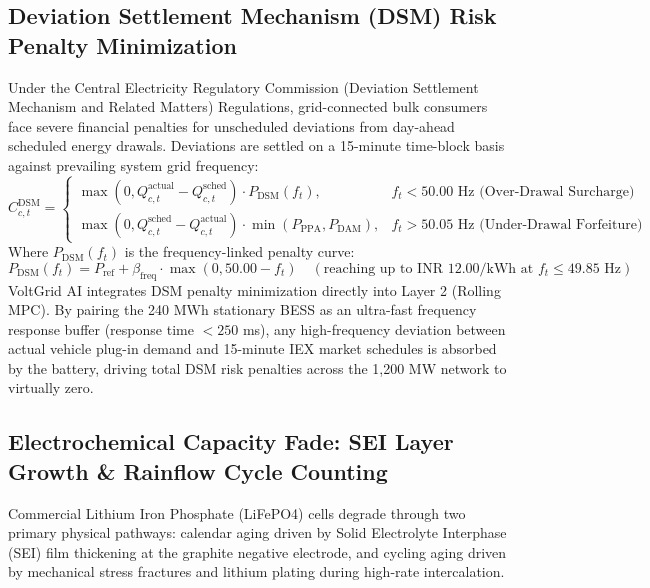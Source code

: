 \documentclass[10.5pt,a4paper]{article}
\begin{document}

\subsection{Deviation Settlement Mechanism (DSM) Risk Penalty Minimization}
Under the Central Electricity Regulatory Commission (Deviation Settlement Mechanism and Related Matters) Regulations, grid-connected bulk consumers face severe financial penalties for unscheduled deviations from day-ahead scheduled energy drawals. Deviations are settled on a 15-minute time-block basis against prevailing system grid frequency:
\begin{equation}
    C_{c,t}^{\text{DSM}} = \begin{cases}
        \max\left( 0, Q_{c,t}^{\text{actual}} - Q_{c,t}^{\text{sched}} \right) \cdot P_{\text{DSM}}(f_t), & f_t < 50.00\text{ Hz (Over-Drawal Surcharge)} \\
        \max\left( 0, Q_{c,t}^{\text{sched}} - Q_{c,t}^{\text{actual}} \right) \cdot \min\left( P_{\text{PPA}}, P_{\text{DAM}} \right), & f_t > 50.05\text{ Hz (Under-Drawal Forfeiture)}
    \end{cases}
\end{equation}
Where $P_{\text{DSM}}(f_t)$ is the frequency-linked penalty curve:
\begin{equation}
    P_{\text{DSM}}(f_t) = P_{\text{ref}} + \beta_{\text{freq}} \cdot \max(0, 50.00 - f_t) \quad (\text{reaching up to INR } 12.00/\text{kWh at } f_t \le 49.85\text{ Hz})
\end{equation}
VoltGrid AI integrates DSM penalty minimization directly into Layer 2 (Rolling MPC). By pairing the 240 MWh stationary BESS as an ultra-fast frequency response buffer (response time $< 250$ ms), any high-frequency deviation between actual vehicle plug-in demand and 15-minute IEX market schedules is absorbed by the battery, driving total DSM risk penalties across the 1,200 MW network to virtually zero.

\subsection{Electrochemical Capacity Fade: SEI Layer Growth \& Rainflow Cycle Counting}
Commercial Lithium Iron Phosphate (LiFePO4) cells degrade through two primary physical pathways: calendar aging driven by Solid Electrolyte Interphase (SEI) film thickening at the graphite negative electrode, and cycling aging driven by mechanical stress fractures and lithium plating during high-rate intercalation.
\end{document}
